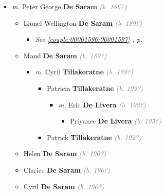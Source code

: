 \documentclass[10pt, openany]{book}
\begin{document}
\begin{itemize}
\item{\textit{m.} Peter George \textbf{De Saram} \textcolor{gray}{\textit{(b. 186?)}}   \label{couple:00001592:00001593} \begin{itemize}
\item{Lionel Wellington  \textbf{De Saram} \textcolor{gray}{\textit{(b. 189?)}}
\begin{itemize}
\item{\textcolor{slteal}{\textit{See  \autoref{couple:00001596:00001597} \textit{, p. \pageref{couple:00001596:00001597} }}}}
\end{itemize}
    }
\item{Maud  \textbf{De Saram} \textcolor{gray}{\textit{(b. 189?)}}
\begin{itemize}
\item{\textit{m.} Cyril \textbf{Tillakeratne} \textcolor{gray}{\textit{(b. 189?)}}   \label{couple:00001627:00001628} \begin{itemize}
\item{Patricia \textbf{Tillakeratne} \textcolor{gray}{\textit{(b. 192?)}}
\begin{itemize}
\item{\textit{m.} Eric \textbf{De Livera} \textcolor{gray}{\textit{(b. 192?)}}   \label{couple:00001630:00001631} \begin{itemize}
\item{Priyanee \textbf{De Livera} \textcolor{gray}{\textit{(b. 195?)}}
  }
\end{itemize}}
\end{itemize}
 }
\item{Patrick \textbf{Tillakeratne} \textcolor{gray}{\textit{(b. 192?)}}
 }
\end{itemize}}
\end{itemize}
   }
\item{Helen \textbf{De Saram} \textcolor{gray}{\textit{(b. 190?)}}
  }
\item{Clarice \textbf{De Saram} \textcolor{gray}{\textit{(b. 190?)}}
  }
\item{Cyril \textbf{De Saram} \textcolor{gray}{\textit{(b. 190?)}}
\begin{itemize}

\end{itemize}}
\end{itemize}}
\end{itemize}
\end{document}
